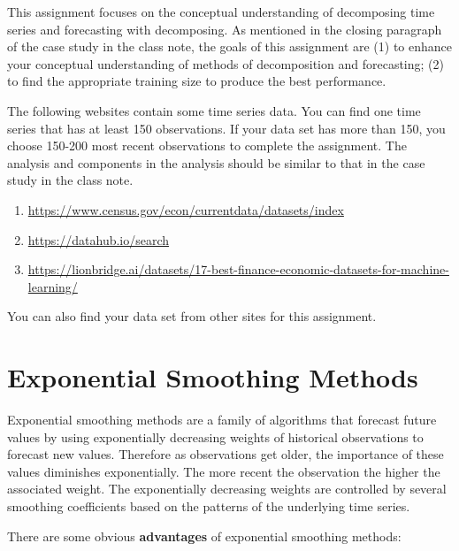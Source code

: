 \documentclass[
]{book}
\begin{document}
This assignment focuses on the conceptual understanding of decomposing time series and forecasting with decomposing. As mentioned in the closing paragraph of the case study in the class note, the goals of this assignment are (1) to enhance your conceptual understanding of methods of decomposition and forecasting; (2) to find the appropriate training size to produce the best performance.

The following websites contain some time series data. You can find one time series that has at least 150 observations. If your data set has more than 150, you choose 150-200 most recent observations to complete the assignment. The analysis and components in the analysis should be similar to that in the case study in the class note.

\begin{enumerate}
\def\labelenumi{\arabic{enumi}.}
\item
  \url{https://www.census.gov/econ/currentdata/datasets/index}
\item
  \url{https://datahub.io/search}
\item
  \url{https://lionbridge.ai/datasets/17-best-finance-economic-datasets-for-machine-learning/}
\end{enumerate}

You can also find your data set from other sites for this assignment.

\hypertarget{exponential-smoothing-methods}{%
\chapter{Exponential Smoothing Methods}\label{exponential-smoothing-methods}}

Exponential smoothing methods are a family of algorithms that forecast future values by using exponentially decreasing weights of historical observations to forecast new values. Therefore as observations get older, the importance of these values diminishes exponentially. The more recent the observation the higher the associated weight. The exponentially decreasing weights are controlled by several smoothing coefficients based on the patterns of the underlying time series.

There are some obvious \textbf{advantages} of exponential smoothing methods:
\end{document}
